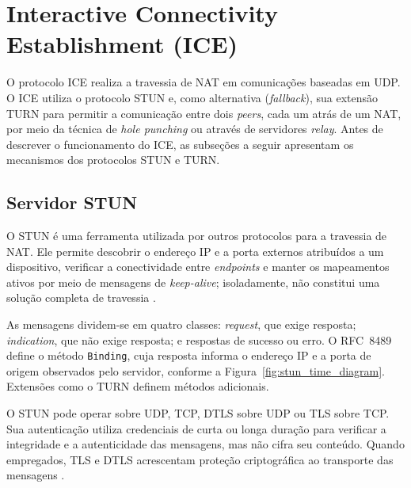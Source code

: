 \section{Interactive Connectivity Establishment (ICE)}
\label{sec:ice}

O protocolo ICE \citep{rfc8445} realiza a travessia de NAT em comunicações baseadas em UDP. O ICE utiliza o protocolo STUN e, como alternativa (\textit{fallback}), sua extensão TURN para permitir a comunicação entre dois \textit{peers}, cada um atrás de um NAT, por meio da técnica de \textit{hole punching} ou através de servidores \textit{relay}. Antes de descrever o funcionamento do ICE, as subseções a seguir apresentam os mecanismos dos protocolos STUN e TURN.


\subsection{Servidor STUN}
\label{sec:stun_server}

O STUN é uma ferramenta utilizada por outros protocolos para a travessia de NAT. Ele permite descobrir o endereço IP e a porta externos atribuídos a um dispositivo, verificar a conectividade entre \textit{endpoints} e manter os mapeamentos ativos por meio de mensagens de \textit{keep-alive}; isoladamente, não constitui uma solução completa de travessia \citep{rfc8489}.

As mensagens dividem-se em quatro classes: \textit{request}, que exige resposta; \textit{indication}, que não exige resposta; e respostas de sucesso ou erro. O RFC~8489 \citep{rfc8489} define o método \texttt{Binding}, cuja resposta informa o endereço IP e a porta de origem observados pelo servidor, conforme a Figura~\ref{fig:stun_time_diagram}. Extensões como o TURN definem métodos adicionais.

O STUN pode operar sobre UDP, TCP, DTLS sobre UDP ou TLS sobre TCP. Sua autenticação utiliza credenciais de curta ou longa duração para verificar a integridade e a autenticidade das mensagens, mas não cifra seu conteúdo. Quando empregados, TLS e DTLS acrescentam proteção criptográfica ao transporte das mensagens \citep{rfc8489}.

